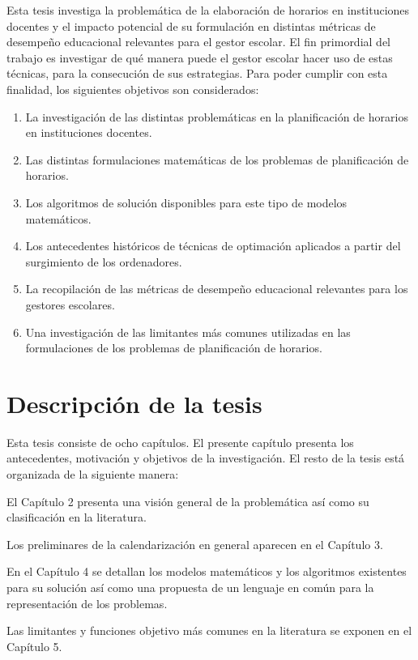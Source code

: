 \documentclass[draft,12pt,headsepline,footsepline,paper=letter]{scrreprt}
\begin{document}
Esta tesis investiga la problemática de la elaboración de horarios en instituciones docentes y el impacto potencial de su formulación en distintas métricas de desempeño educacional relevantes para el gestor escolar. 
El fin primordial del trabajo es investigar de qué manera puede el gestor escolar hacer uso de estas técnicas, para la consecución de sus estrategias.
Para poder cumplir con esta finalidad, los siguientes objetivos son considerados:
\begin{enumerate}[1]
\item La investigación de las distintas problemáticas en la planificación de horarios en instituciones docentes.
\item Las distintas formulaciones matemáticas de los problemas de planificación de horarios.
\item Los algoritmos de solución disponibles para este tipo de modelos matemáticos.
\item Los antecedentes históricos de técnicas de optimación aplicados a partir del surgimiento de los ordenadores.
\item La recopilación de las métricas de desempeño educacional relevantes para los gestores escolares.
\item Una investigación de las limitantes más comunes utilizadas en las formulaciones de los problemas de planificación de horarios.
\end{enumerate}

\section{Descripción de la tesis}

Esta tesis consiste de ocho capítulos. El presente capítulo presenta los antecedentes, motivación y objetivos de la investigación. El resto de la tesis está organizada de la siguiente manera:

El Capítulo 2 presenta una visión general de la problemática así como su clasificación en la literatura.

Los preliminares de la calendarización en general aparecen en el Capítulo 3.

En el Capítulo 4 se detallan los modelos matemáticos y los algoritmos existentes para su solución así como una propuesta de un lenguaje en común para la representación de los problemas.

Las limitantes y funciones objetivo más comunes en la literatura se exponen en el Capítulo 5.
\end{document}

